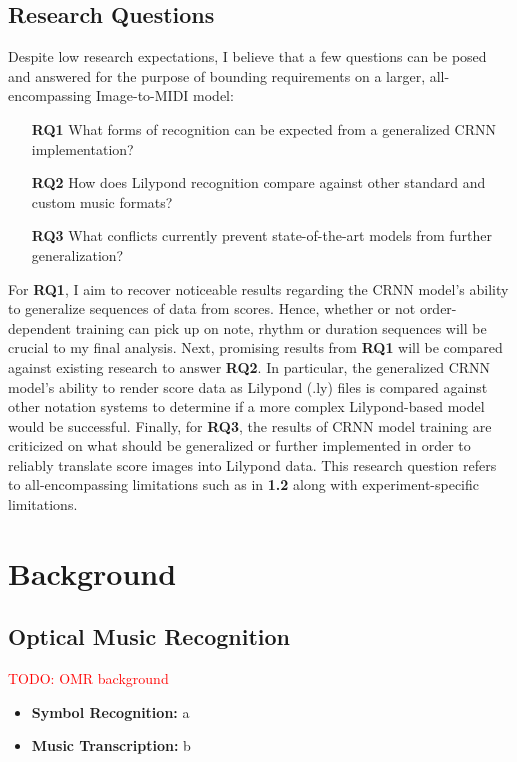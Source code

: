\documentclass[review,sigconf]{acmart}
\newcommand{\todo}[1]{\textcolor{red}{TODO: #1}}
\begin{document}
\subsection{Research Questions}

Despite low research expectations, I believe that a few questions can be posed and answered for the purpose of bounding requirements on a larger, all-encompassing Image-to-MIDI model:

\begin{itemize}
	\item [\textbf{RQ1}] What forms of recognition can be expected from a generalized CRNN implementation?
	\item [\textbf{RQ2}] How does Lilypond recognition compare against other standard and custom music formats?
	\item [\textbf{RQ3}] What conflicts currently prevent state-of-the-art models from further generalization?
\end{itemize}

For \textbf{RQ1}, I aim to recover noticeable results regarding the CRNN model's ability to generalize sequences of data from scores.
Hence, whether or not order-dependent training can pick up on note, rhythm or duration sequences will be crucial to my final analysis.
Next, promising results from \textbf{RQ1} will be compared against existing research to answer \textbf{RQ2}. 
In particular, the generalized CRNN model's ability to render score data as Lilypond (.ly) files is compared against other notation systems to determine if a more complex Lilypond-based model would be successful.
Finally, for \textbf{RQ3}, the results of CRNN model training are criticized on what should be generalized or further implemented in order to reliably translate score images into Lilypond data.
This research question refers to all-encompassing limitations such as in \textbf{1.2} along with experiment-specific limitations.

\section{Background}
\subsection{Optical Music Recognition}
\todo{OMR background}

\begin{itemize}
	\item \textbf{Symbol Recognition:} a
	\item \textbf{Music Transcription:} b
\end{itemize}
\end{document}
